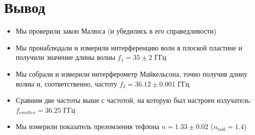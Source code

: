 \documentclass[a4paper, 12pt]{article}
\begin{document}
    \section*{Вывод}
    \begin{itemize}
        \item Мы проверили закон Малюса (и убедились в его справедливости)
        \item Мы пронаблюдали и измерили интерференцию волн в плоской пластине и получили значение длины волны $f_1 = 35 \pm 2 \text{ ГГц}$
        \item Мы собрали и измерили интерферометр Майкельсона, точно получив длину волны и, соответственно, частоту $f_2 = 36.12 \pm 0.001 \text{ ГГц}$
        \item Сравним две частоты выше с частотой, на которую был настроен излучатель: $f_{emitter} = 36.25$ ГГц
        \item Мы измерили показатель преломления тефлона $n = 1.33 \pm 0.02$ ($n_{tabl} = 1.4$)
        
        
    \end{itemize}
    
\end{document}
